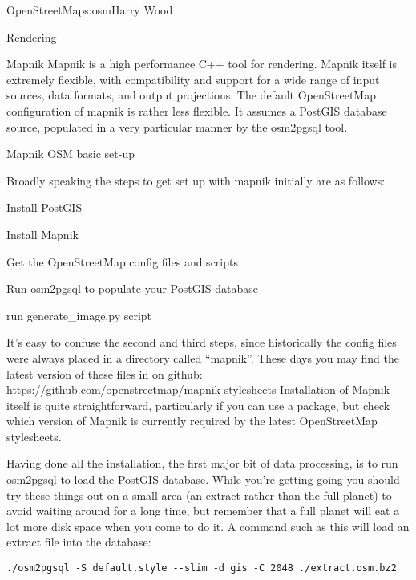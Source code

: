 \begin{aosachapter}{OpenStreetMap}{s:osm}{Harry Wood}
\begin{aosasect1}{Rendering}
\begin{aosasect2}{Mapnik}
Mapnik is a high performance C++ tool for rendering. Mapnik itself is
extremely flexible, with compatibility and support for a wide range of
input sources, data formats, and output projections. The default
OpenStreetMap configuration of mapnik is rather less flexible. It
assumes a PostGIS database source, populated in a very particular
manner by the osm2pgsql tool.

\end{aosasect2}

\begin{aosasect2}{Mapnik OSM basic set-up}

Broadly speaking the steps to get set up with mapnik initially are as
follows:

\begin{aosaitemize}

\item Install PostGIS

\item Install Mapnik

\item Get the OpenStreetMap config files and scripts

\item Run osm2pgsql to populate your PostGIS database

\item run generate\_image.py script

\end{aosaitemize}

It's easy to confuse the second and third steps, since historically
the config files were always placed in a directory called
``mapnik''. These days you may find the latest version of these files
in on github: https://github.com/openstreetmap/mapnik-stylesheets
Installation of Mapnik itself is quite straightforward, particularly
if you can use a package, but check which version of Mapnik is
currently required by the latest OpenStreetMap stylesheets.

Having done all the installation, the first major bit of data
processing, is to run osm2pgsql to load the PostGIS database. While
you're getting going you should try these things out on a small area
(an extract rather than the full planet) to avoid waiting around for a
long time, but remember that a full planet will eat a lot more disk
space when you come to do it. A command such as this will load an
extract file into the database:

\begin{verbatim}
./osm2pgsql -S default.style --slim -d gis -C 2048 ./extract.osm.bz2
\end{verbatim}


\end{aosasect2}
\end{aosasect1}
\end{aosachapter}
